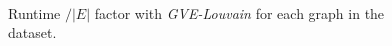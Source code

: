 \begin{figure}[hbtp]
  \centering
   \\[-2ex]
  \caption{Runtime $/ |E|$ factor with \textit{GVE-Louvain} for each graph in the dataset.}
  \label{fig:louvain-hardness}
\end{figure}
